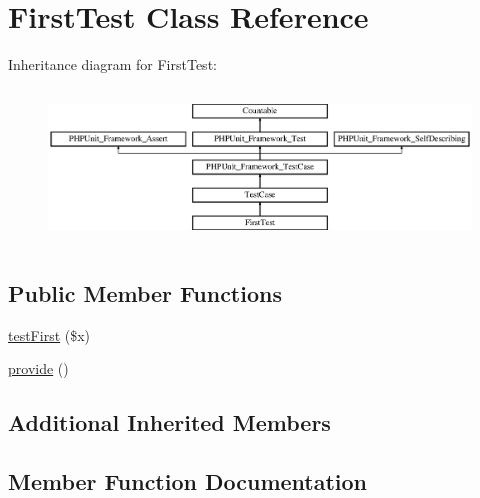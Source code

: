 \hypertarget{class_foo_1_1_data_provider_issue2833_1_1_first_test}{}\section{First\+Test Class Reference}
\label{class_foo_1_1_data_provider_issue2833_1_1_first_test}
Inheritance diagram for First\+Test\+:\begin{figure}[H]
\begin{center}
\leavevmode
\includegraphics[height=4.129793cm]{class_foo_1_1_data_provider_issue2833_1_1_first_test}
\end{center}
\end{figure}
\subsection*{Public Member Functions}
\begin{DoxyCompactItemize}
\item 
\mbox{\hyperlink{class_foo_1_1_data_provider_issue2833_1_1_first_test_af8ab67a72789da589982c3966d8642ef}{test\+First}} (\$x)
\item 
\mbox{\hyperlink{class_foo_1_1_data_provider_issue2833_1_1_first_test_a70dcc3876ac2d22d8895b012ccd46daf}{provide}} ()
\end{DoxyCompactItemize}
\subsection*{Additional Inherited Members}


\subsection{Member Function Documentation}
\mbox{\label{class_foo_1_1_data_provider_issue2833_1_1_first_test_a70dcc3876ac2d22d8895b012ccd46daf}} 
